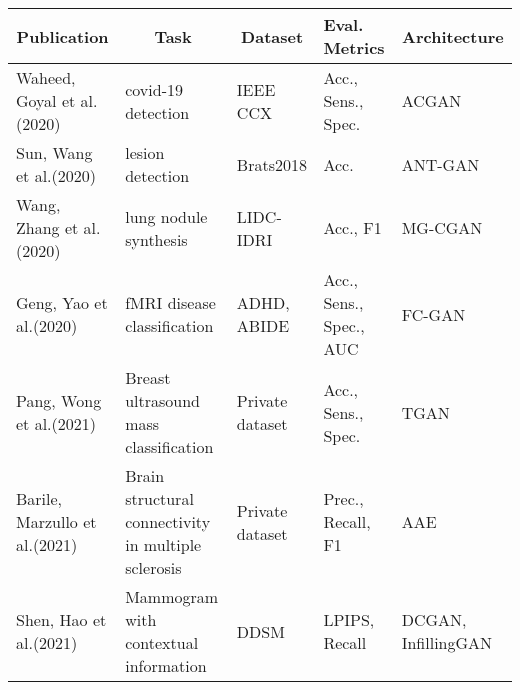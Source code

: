 \documentclass[preprint,12pt,authoryear]{elsarticle}
\begin{document}
{\small
\begin{longtable}{|p{2cm}|p{3cm}|p{2cm}|p{2cm}|p{2cm}|}
\hline
\multicolumn{1}{|c|}{\textbf{Publication}} & \multicolumn{1}{c|}{\textbf{Task}}                         & \multicolumn{1}{c|}{\textbf{Dataset}}                              & \multicolumn{1}{p{2cm}|}{\textbf{Eval. Metrics}}               & \multicolumn{1}{c|}{\textbf{Architecture}} \\ \hline
Waheed, Goyal et al.(2020)\cite{apl1}         & covid-19 detection                                        & IEEE CCX                                                          & Acc., Sens., Spec.                                       & ACGAN                                     \\ \hline
Sun, Wang et al.(2020)\cite{apl2}             & lesion detection                                          & Brats2018                                                         & Acc.                                                     & ANT-GAN                                   \\ \hline
Wang, Zhang et al.(2020)\cite{apl3}           & lung nodule synthesis                                     & LIDC-IDRI                                                         & Acc., F1                                                 & MG-CGAN                                   \\ \hline
Geng, Yao et al.(2020)\cite{apl4}             & fMRI disease classification                               & ADHD, ABIDE                                                       & Acc., Sens., Spec., AUC                                  & FC-GAN                                    \\ \hline
Pang, Wong et al.(2021)\cite{apl5}            & Breast ultrasound mass classification                     & Private dataset                                                   & Acc., Sens., Spec.                                       & TGAN                                      \\ \hline
Barile, Marzullo et al.(2021)\cite{apl6}      & Brain structural connectivity in multiple sclerosis       & Private dataset                                                   & Prec., Recall, F1                                        & AAE                                       \\ \hline
Shen, Hao et al.(2021)\cite{apl7}             & Mammogram with contextual information                     & DDSM                                                              & LPIPS, Recall                                            & DCGAN, InfillingGAN                       \\ \hline

\end{longtable}}
\end{document}
